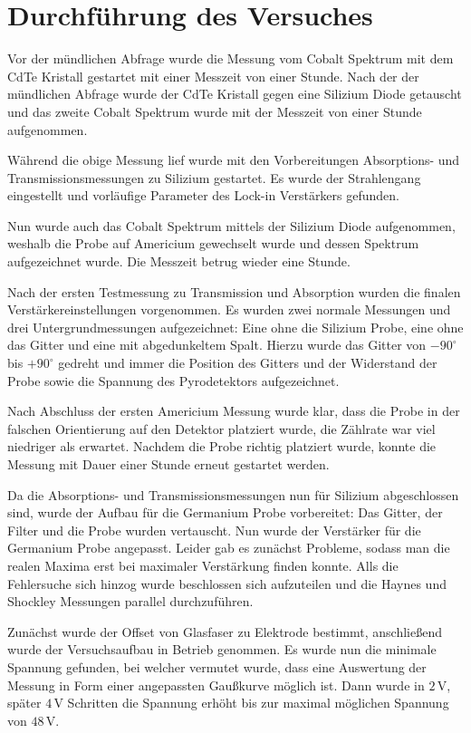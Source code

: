 \section{Durchführung des Versuches}
Vor der mündlichen Abfrage wurde die Messung vom Cobalt Spektrum mit dem CdTe Kristall gestartet mit einer Messzeit von einer Stunde. Nach der der mündlichen Abfrage wurde der CdTe Kristall gegen eine Silizium Diode getauscht und das zweite Cobalt Spektrum wurde mit der Messzeit von einer Stunde aufgenommen. \par
Während die obige Messung lief wurde mit den Vorbereitungen Absorptions- und Transmissionsmessungen zu Silizium gestartet. Es wurde der Strahlengang eingestellt und vorläufige Parameter des Lock-in Verstärkers gefunden.\par
Nun wurde auch das Cobalt Spektrum mittels der Silizium Diode aufgenommen, weshalb die Probe auf Americium gewechselt wurde und dessen Spektrum aufgezeichnet wurde. Die Messzeit betrug wieder eine Stunde.\par
Nach der ersten Testmessung zu Transmission und Absorption wurden die finalen Verstärkereinstellungen vorgenommen. Es wurden zwei normale Messungen und drei Untergrundmessungen aufgezeichnet: Eine ohne die Silizium Probe, eine ohne das Gitter und eine mit abgedunkeltem Spalt. Hierzu wurde das Gitter von $-90^{\circ}$ bis $+90^{\circ}$ gedreht und immer die Position des Gitters und der Widerstand der Probe sowie die Spannung des Pyrodetektors aufgezeichnet.\par
Nach Abschluss der ersten Americium Messung wurde klar, dass die Probe in der falschen Orientierung auf den Detektor platziert wurde, die Zählrate war viel niedriger als erwartet. Nachdem die Probe richtig platziert wurde, konnte die Messung mit Dauer einer Stunde erneut gestartet werden.\par
Da die Absorptions- und Transmissionsmessungen nun für Silizium abgeschlossen sind, wurde der Aufbau für die Germanium Probe vorbereitet: Das Gitter, der Filter und die Probe wurden vertauscht. Nun wurde der Verstärker für die Germanium Probe angepasst. Leider gab es zunächst Probleme, sodass man die realen Maxima erst bei maximaler Verstärkung finden konnte. Alls die Fehlersuche sich hinzog wurde beschlossen sich aufzuteilen und die Haynes und Shockley Messungen parallel durchzuführen.\par
Zunächst wurde der Offset von Glasfaser zu Elektrode bestimmt, anschließend wurde der Versuchsaufbau in Betrieb genommen. Es wurde nun die minimale Spannung  gefunden, bei welcher vermutet wurde, dass eine Auswertung der Messung in Form einer angepassten Gaußkurve möglich ist. Dann wurde in $2\,$V, später $4\,$V Schritten die Spannung erhöht bis zur maximal möglichen Spannung von $48\,$V.\par

